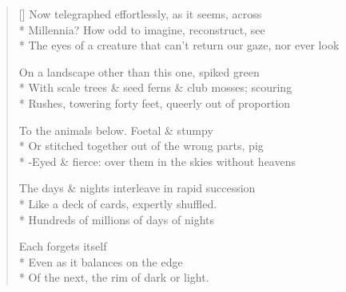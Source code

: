 \begin{verse}[\versewidth]
Now telegraphed effortlessly, as it seems, across\\*
Millennia?  How odd to imagine, reconstruct, see\\*
The eyes of a creature that can't return our gaze, nor ever look

On a landscape other than this one, spiked green\\*
With scale trees \& seed ferns \& club mosses; scouring\\*
Rushes, towering forty feet, queerly out of proportion

To the animals below.  Foetal \& stumpy\\*
Or stitched together out of the wrong parts, pig\\*
-Eyed \& fierce: over them in the skies without heavens

The days \& nights interleave in rapid succession\\*
Like a deck of cards, expertly shuffled.\\*
Hundreds of millions of days   of nights  

Each forgets itself\\*
Even as it balances on the edge\\*
Of the next, the rim of dark or light.
\end{verse}
